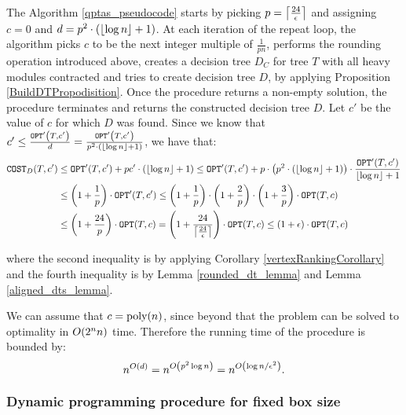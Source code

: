 The Algorithm \ref{qptas_pseudocode} starts by picking $p=\cl{\frac{24}{\epsilon}}$ and assigning $c=0$ and $d=p^2\cdot\br{\fl{\log n}+1}$. At each iteration of the repeat loop, the algorithm picks $c$ to be the next integer multiple of $\frac{1}{pn}$, performs the rounding operation introduced above, creates a decision tree $D_C$ for tree $T$ with all heavy modules contracted and tries to create decision tree $D$, by applying Proposition \ref{BuildDTPropodisition}. Once the \FBuildDt procedure returns a non-empty solution, the \FQPTAS procedure terminates and returns the constructed decision tree $D$. Let $c'$ be the value of $c$ for which $D$ was found. Since we know that $c'\leq \frac{\OPT'\br{T,c'}}{d}=\frac{\OPT'\br{T,c'}}{p^2\cdot\br{\fl{\log n}+1}}$, we have that:
\begin{align*}
    \COST_{D}\br{T,c'}&\leq \OPT'\br{T,c'}+pc'\cdot \br{\fl{\log n}+1}\leq \OPT'\br{T,c'}+p\cdot \br{p^2\cdot\br{\fl{\log n}+1}}\cdot \frac{\OPT'\br{T,c'}}{\fl{\log n}+1} \\
    & \leq \br{1+\frac{1}{p}}\cdot\OPT'\br{T,c'}\leq \br{1+\frac{1}{p}}\cdot\br{1+\frac{2}{p}}\cdot\br{1+\frac{3}{p}}\cdot\OPT\br{T,c}
    \\&
    \leq \br{1+\frac{24}{p}}\cdot\OPT\br{T,c} = \br{1+\frac{24}{\cl{\frac{24}{\epsilon}}}}\cdot\OPT\br{T,c}\leq \br{1+\epsilon}\cdot \OPT\br{T,c}
\end{align*}
    
where the second inequality is by applying Corollary \ref{vertexRankingCorollary} and the fourth inequality is by Lemma \ref{rounded_dt_lemma} and Lemma \ref{aligned_dts_lemma}.

We can assume that $c=\text{poly}\br{n}$, since beyond that the problem can be solved to optimality in $O\br{2^nn}$ time. Therefore the running time of the procedure is bounded by:
$$
n^{O\br{d}}=n^{O\br{p^2\log n}}=n^{O\br{\log n/\epsilon^2}}.
$$
\subsubsection{Dynamic programming procedure for fixed box size}



